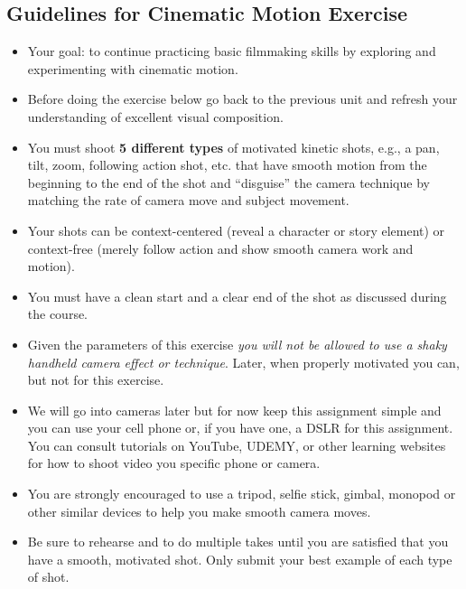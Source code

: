 \documentclass[
]{book}
\providecommand{\tightlist}{%
  \setlength{\itemsep}{0pt}\setlength{\parskip}{0pt}}
\begin{document}
\begin{assessment}
\hypertarget{guidelines-for-cinematic-motion-exercise}{%
\subsection*{Guidelines for Cinematic Motion Exercise}\label{guidelines-for-cinematic-motion-exercise}}

\begin{itemize}
\tightlist
\item
  Your goal: to continue practicing basic filmmaking skills by exploring and experimenting with cinematic motion.\\
\item
  Before doing the exercise below go back to the previous unit and refresh your understanding of excellent visual composition.\\
\item
  You must shoot \textbf{5 different types} of motivated kinetic shots, e.g., a pan, tilt, zoom, following action shot, etc. that have smooth motion from the beginning to the end of the shot and ``disguise'' the camera technique by matching the rate of camera move and subject movement.\\
\item
  Your shots can be context-centered (reveal a character or story element) or context-free (merely follow action and show smooth camera work and motion).
\item
  You must have a clean start and a clear end of the shot as discussed during the course.
\item
  Given the parameters of this exercise \emph{you will not be allowed to use a shaky handheld camera effect or technique}. Later, when properly motivated you can, but not for this exercise.
\item
  We will go into cameras later but for now keep this assignment simple and you can use your cell phone or, if you have one, a DSLR for this assignment. You can consult tutorials on YouTube, UDEMY, or other learning websites for how to shoot video you specific phone or camera.
\item
  You are strongly encouraged to use a tripod, selfie stick, gimbal, monopod or other similar devices to help you make smooth camera moves.
\item
  Be sure to rehearse and to do multiple takes until you are satisfied that you have a smooth, motivated shot. Only submit your best example of each type of shot.

\end{itemize}
\end{assessment}
\end{document}

